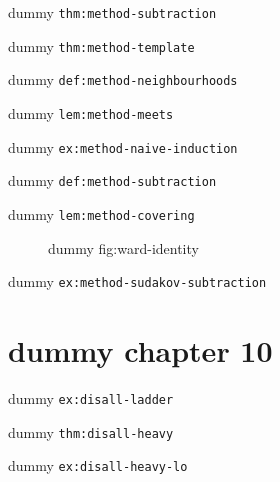 \begin{theorem}\label{thm:method-subtraction}dummy \texttt{thm:method-subtraction}\end{theorem}
\begin{theorem}\label{thm:method-template}dummy \texttt{thm:method-template}\end{theorem}
\begin{table}[h]\centering\caption{dummy tab:method-hypotheses}\label{tab:method-hypotheses}\end{table}
\begin{definition}\label{def:method-neighbourhoods}dummy \texttt{def:method-neighbourhoods}\end{definition}
\begin{lemma}\label{lem:method-meets}dummy \texttt{lem:method-meets}\end{lemma}
\begin{example}\label{ex:method-naive-induction}dummy \texttt{ex:method-naive-induction}\end{example}
\begin{definition}\label{def:method-subtraction}dummy \texttt{def:method-subtraction}\end{definition}
\begin{lemma}\label{lem:method-covering}dummy \texttt{lem:method-covering}\end{lemma}
\begin{figure}[h]\centering{}\caption{dummy fig:ward-identity}\label{fig:ward-identity}\end{figure}
\begin{example}\label{ex:method-sudakov-subtraction}dummy \texttt{ex:method-sudakov-subtraction}\end{example}
\setcounter{chapter}{10}\addtocounter{chapter}{-1}
\chapter{dummy chapter 10}
\begin{example}\label{ex:disall-ladder}dummy \texttt{ex:disall-ladder}\end{example}
\begin{theorem}\label{thm:disall-heavy}dummy \texttt{thm:disall-heavy}\end{theorem}
\begin{example}\label{ex:disall-heavy-lo}dummy \texttt{ex:disall-heavy-lo}\end{example}
\setcounter{chapter}{11}\addtocounter{chapter}{-1}
